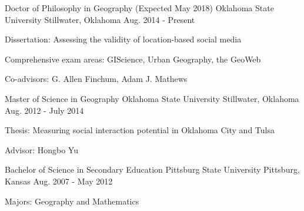 

\begin{cventries}

  \cventry
  {Doctor of Philosophy in Geography (Expected May 2018)} %
  {Oklahoma State University} %
  {Stillwater, Oklahoma} %
  {Aug. 2014 - Present} %
  {
    \begin{cvitems} %
    \item {Dissertation: Assessing the validity of location-based social media}
    \item {Comprehensive exam areas: GIScience, Urban Geography, the GeoWeb}
    \item {Co-advisors: G. Allen Finchum, Adam J. Mathews}
    \end{cvitems}
  }

  \cventry
  {Master of Science in Geography} %
  {Oklahoma State University} %
  {Stillwater, Oklahoma} %
  {Aug. 2012 - July 2014} %
  {
    \begin{cvitems} %
    \item {Thesis: Measuring social interaction potential in Oklahoma City and Tulsa}
    \item {Advisor: Hongbo Yu}
    \end{cvitems}
  }

  \cventry
  {Bachelor of Science in Secondary Education} %
  {Pittsburg State University} %
  {Pittsburg, Kansas} %
  {Aug. 2007 - May 2012} %
  {
    \begin{cvitems} %
    \item {Majors: Geography and Mathematics}
    \end{cvitems}
  }
\end{cventries}
